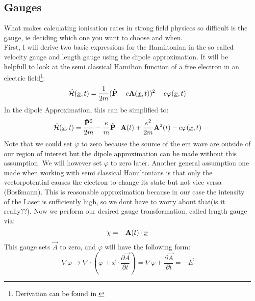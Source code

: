 \subsection{Gauges}
What makes calculating ionisation rates in strong field physiccs so difficult is the gauge, ie deciding which one you want to choose and when. \\
First, I will derive two basic expressions for the Hamiltonian in the so called velocity gauge and length gauge using the dipole approximation.
It will be helpfull to look at the semi classical Hamilton function of a free electron in an electric field\footnote{Derivation can be found in \cite{LandauLifschitzBand2}}: %
\begin{equation} %
    \hat{\Hs}(\uvec{x}, t) = \frac{1}{2m}(\vec{\hat{P}} - e \vec{A}(\uvec{x}, t))^2 - e \varphi(\uvec{x}, t)  \label{eq:semiClassicalHamilton}    %
\end{equation}
In the dipole Approximation, this can be simplified to:
\begin{equation*}
    \hat{\Hs}(\uvec{x}, t) = \frac{\vec{\hat{P}}^2}{2m} - \frac{e}{m}\vec{\hat{P}}\cdot \vec{A}(t) + \frac{e^2}{2m}\vec{A}^2(t) - e \varphi(\uvec{x}, t) %
\end{equation*}
Note that we could set $\varphi$ to zero because the source of the em wave are outside of our region of interest but the dipole approximation can be made without this assumption. 
We will however set $\varphi$ to zero later. 
Another general assumption one made when working with semi classical Hamiltonians is that only the vectorpotential causes the electron to change its state but not vice versa (Bosßmann). 
This is reasonable approximation because in our case the intensity of the Laser is sufficiently high, so we dont have to worry about that(is it really??).
Now we perform our desired gauge transformation, called length gauge via:
\begin{equation*}
    \chi = -\vec{A}(t)\cdot \uvec{x} %
\end{equation*}
This gauge sets $\vec{A}$ to zero, and $\varphi$ will have the following form:
\begin{equation*}
    \nabla \varphi \to \nabla \cdot (\varphi + \vec{x} \cdot \frac{\partial \vec{A}}{\partial t}) = \nabla \varphi + \frac{\partial \vec{A}}{\partial t} = - \vec{E}
\end{equation*}%
